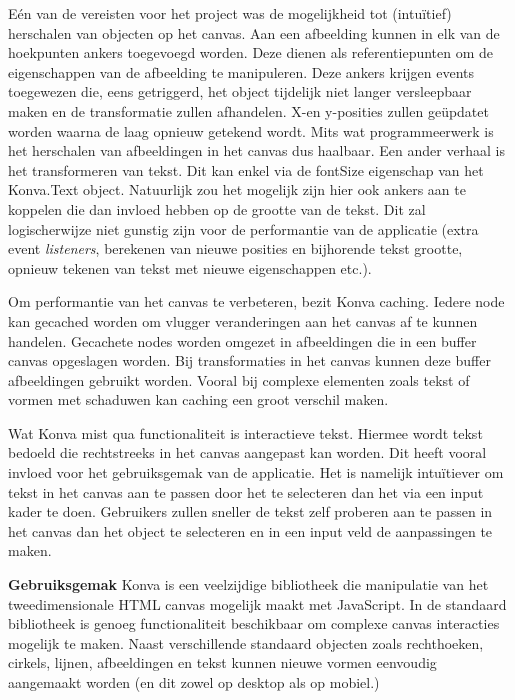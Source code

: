 E\'{e}n van de vereisten voor het project was de mogelijkheid tot (intu\"{i}tief) herschalen van objecten op het canvas. Aan een afbeelding kunnen in elk van de hoekpunten ankers toegevoegd worden. Deze dienen als referentiepunten om de eigenschappen van de afbeelding te manipuleren. Deze ankers krijgen events toegewezen die, eens getriggerd, het object tijdelijk niet langer versleepbaar maken en de transformatie zullen afhandelen. X-en y-posities zullen ge\"{u}pdatet worden waarna de laag opnieuw getekend wordt. Mits wat programmeerwerk is het herschalen van afbeeldingen in het canvas dus haalbaar. Een ander verhaal is het transformeren van tekst. Dit kan enkel via de fontSize eigenschap van het Konva.Text object. Natuurlijk zou het mogelijk zijn hier ook ankers aan te koppelen die dan invloed hebben op de grootte van de tekst. Dit zal logischerwijze niet gunstig zijn voor de performantie van de applicatie (extra event \textit{listeners}, berekenen van nieuwe posities en bijhorende tekst grootte, opnieuw tekenen van tekst met nieuwe eigenschappen etc.). %

\newpage
Om performantie van het canvas te verbeteren, bezit Konva caching. Iedere node kan gecached worden om vlugger veranderingen aan het canvas af te kunnen handelen. Gecachete nodes worden omgezet in afbeeldingen die in een buffer canvas opgeslagen worden. Bij transformaties in het canvas kunnen deze buffer afbeeldingen gebruikt worden. Vooral bij complexe elementen zoals tekst of vormen met schaduwen kan caching een groot verschil maken. 

Wat Konva mist qua functionaliteit is interactieve tekst. Hiermee wordt tekst bedoeld die rechtstreeks in het canvas aangepast kan worden. Dit heeft vooral invloed voor het gebruiksgemak van de applicatie. Het is namelijk intu\"{i}tiever om tekst in het canvas aan te passen door het te selecteren dan het via een input kader te doen. Gebruikers zullen sneller de tekst zelf proberen aan te passen in het canvas dan het object te selecteren en in een input veld de aanpassingen te maken.  %

\textbf{Gebruiksgemak} \break
Konva is een veelzijdige bibliotheek die manipulatie van het tweedimensionale HTML canvas mogelijk maakt met JavaScript. In de standaard bibliotheek is genoeg functionaliteit beschikbaar om complexe canvas interacties mogelijk te maken. Naast verschillende standaard objecten zoals rechthoeken, cirkels, lijnen, afbeeldingen en tekst kunnen nieuwe vormen eenvoudig aangemaakt worden (en dit zowel op desktop als op mobiel.)

